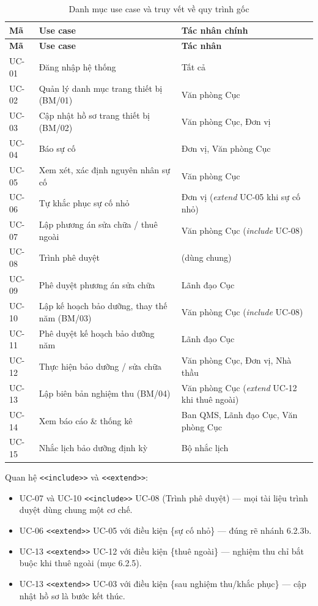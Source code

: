 \begin{longtable}{P{1.8cm}P{9.4cm}P{4.2cm}}
\caption{Danh mục use case và truy vết về quy trình gốc}\label{tab:uc-list}\\
\toprule
\textbf{Mã} & \textbf{Use case} & \textbf{Tác nhân chính} \\
\midrule
\endfirsthead
\toprule
\textbf{Mã} & \textbf{Use case} & \textbf{Tác nhân} \\
\midrule
\endhead
UC-01 & Đăng nhập hệ thống & Tất cả \\
UC-02 & Quản lý danh mục trang thiết bị (BM/01) & Văn phòng Cục \\
UC-03 & Cập nhật hồ sơ trang thiết bị (BM/02) & Văn phòng Cục, Đơn vị \\
UC-04 & Báo sự cố & Đơn vị, Văn phòng Cục \\
UC-05 & Xem xét, xác định nguyên nhân sự cố & Văn phòng Cục \\
UC-06 & Tự khắc phục sự cố nhỏ & Đơn vị (\textit{extend} UC-05 khi sự cố nhỏ) \\
UC-07 & Lập phương án sửa chữa / thuê ngoài & Văn phòng Cục (\textit{include} UC-08) \\
UC-08 & Trình phê duyệt & (dùng chung) \\
UC-09 & Phê duyệt phương án sửa chữa & Lãnh đạo Cục \\
UC-10 & Lập kế hoạch bảo dưỡng, thay thế năm (BM/03) & Văn phòng Cục (\textit{include} UC-08) \\
UC-11 & Phê duyệt kế hoạch bảo dưỡng năm & Lãnh đạo Cục \\
UC-12 & Thực hiện bảo dưỡng / sửa chữa & Văn phòng Cục, Đơn vị, Nhà thầu \\
UC-13 & Lập biên bản nghiệm thu (BM/04) & Văn phòng Cục (\textit{extend} UC-12 khi thuê ngoài) \\
UC-14 & Xem báo cáo \& thống kê & Ban QMS, Lãnh đạo Cục, Văn phòng Cục \\
UC-15 & Nhắc lịch bảo dưỡng định kỳ & Bộ nhắc lịch \\
\bottomrule
\end{longtable}

Quan hệ \texttt{<<include>>} và \texttt{<<extend>>}:
\begin{itemize}
  \item UC-07 và UC-10 \texttt{<<include>>} UC-08 (Trình phê duyệt) — mọi tài liệu trình duyệt dùng chung một cơ chế.
  \item UC-06 \texttt{<<extend>>} UC-05 với điều kiện \{sự cố nhỏ\} — đúng rẽ nhánh 6.2.3b.
  \item UC-13 \texttt{<<extend>>} UC-12 với điều kiện \{thuê ngoài\} — nghiệm thu chỉ bắt buộc khi thuê ngoài (mục 6.2.5).
  \item UC-13 \texttt{<<extend>>} UC-03 với điều kiện \{sau nghiệm thu/khắc phục\} — cập nhật hồ sơ là bước kết thúc.
\end{itemize}


